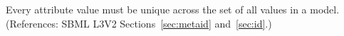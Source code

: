 Every  attribute value must be unique across the set of all
 values in a model.  (References: SBML L3V2
Sections~\ref{sec:metaid} and~\ref{sec:id}.)
